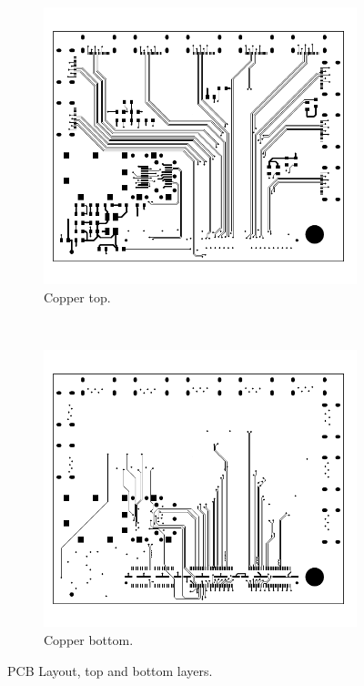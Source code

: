 \documentclass[main.tex]{subfiles}
\begin{document}
\begin{figure}[]
    \centering
    \begin{subfigure}[t]{0.5\textwidth}
        \centering
        \includegraphics[width=\linewidth, angle=0]{../img/pcb_top}
        \caption{Copper top.}
    \end{subfigure}%
    \\
    \begin{subfigure}[t]{0.5\textwidth}
        \centering
        \includegraphics[width=\linewidth, angle=0]{../img/pcb_btm}
        \caption{Copper bottom.}
    \end{subfigure}
    \caption{PCB Layout, top and bottom layers.}
    \label{fig:pcb_tb}
\end{figure}
\end{document}
